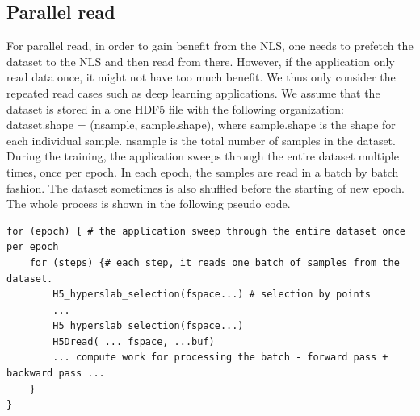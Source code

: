 \documentclass[aps, rmp, 11pt, notitlepage]{revtex4-1}
\begin{document}
\subsection{Parallel read}
For parallel read, in order to gain benefit from the NLS, one needs to prefetch the dataset to the NLS and then read from there. However, if the application only read data once, it might not have too much benefit. We thus only consider the repeated read cases such as deep learning applications.
We assume that the dataset is stored in a one HDF5 file with the following organization: dataset.shape = (nsample, sample.shape), where sample.shape is the shape for each individual sample. {nsample} is the total number of samples in the dataset. During the training, the application sweeps through the entire dataset multiple times, once per epoch. In each epoch, the samples are read in a batch by batch fashion. The dataset sometimes is also shuffled before the starting of new epoch. The whole process is shown in the following pseudo code. 
\begin{lstlisting}
for (epoch) { # the application sweep through the entire dataset once per epoch
	for (steps) {# each step, it reads one batch of samples from the dataset. 
		H5_hyperslab_selection(fspace...) # selection by points 
		...
		H5_hyperslab_selection(fspace...)
		H5Dread( ... fspace, ...buf)
		... compute work for processing the batch - forward pass + backward pass ... 
	}
}
\end{lstlisting}
\end{document}
